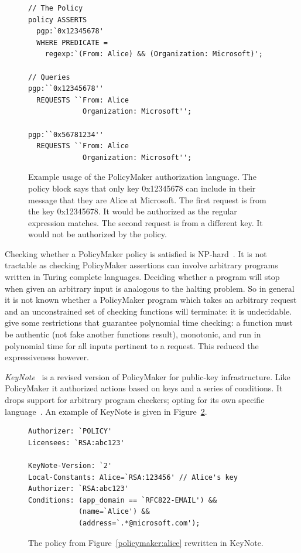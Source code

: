 \documentclass[a4paper]{article}
\begin{document}
\begin{figure}\label{policymaker:alice}
\begin{lstlisting}[language=PolicyMaker]
// The Policy
policy ASSERTS
  pgp:`0x12345678'
  WHERE PREDICATE =
    regexp:`(From: Alice) && (Organization: Microsoft)';

// Queries
pgp:``0x12345678''
  REQUESTS ``From: Alice
             Organization: Microsoft'';

pgp:``0x56781234''
  REQUESTS ``From: Alice
             Organization: Microsoft'';
\end{lstlisting}
  \caption{Example usage of the PolicyMaker authorization language.      
    The policy block says that only key 0x12345678 can include in their message
    that they are Alice at Microsoft.  
    The first request is from the key 0x12345678. It would be authorized as the
    regular expression matches.  
    The second request is from a different key.  It would not be authorized by the
    policy.} 
\label{sec:pollang}
\end{figure}

Checking whether a PolicyMaker policy is satisfied is
NP-hard~\cite{Blaze:1998fq}.  It is not tractable as checking PolicyMaker
assertions can involve arbitrary programs written in Turing complete languages.
Deciding whether a program will stop when given an arbitrary input is analogous
to the halting problem.  So in general it is not known whether a PolicyMaker
program which takes an arbitrary request and an unconstrained set of checking
functions will terminate: it is undecidable.  \citeauthor{Blaze:1998fq} give some
restrictions that guarantee polynomial time checking: a function must be
authentic (not fake another functions result), monotonic, and run in polynomial
time for all inputs pertinent to a request.  This reduced the expressiveness
however.

\emph{KeyNote}~\cite{Blaze:1999fa} is a revised version of PolicyMaker
for public-key infrastructure.  Like PolicyMaker it authorized actions based on
keys and a series of conditions.  It drops support for arbitrary program
checkers; opting for its own specific language~\cite{Blaze:1999vc}.  An example
of KeyNote is given in Figure~\ref{keynote:example}. 

\begin{figure}
  \begin{lstlisting}[language=KeyNote]
Authorizer: `POLICY'
Licensees: `RSA:abc123'

KeyNote-Version: `2'
Local-Constants: Alice=`RSA:123456' // Alice's key
Authorizer: `RSA:abc123'
Conditions: (app_domain == `RFC822-EMAIL') &&
            (name=`Alice') &&
            (address=`.*@microsoft.com');
  \end{lstlisting}
  \caption{The policy from Figure~\ref{policymaker:alice} rewritten in KeyNote.}
  
\label{keynote:example}
\end{figure}
\end{document}

